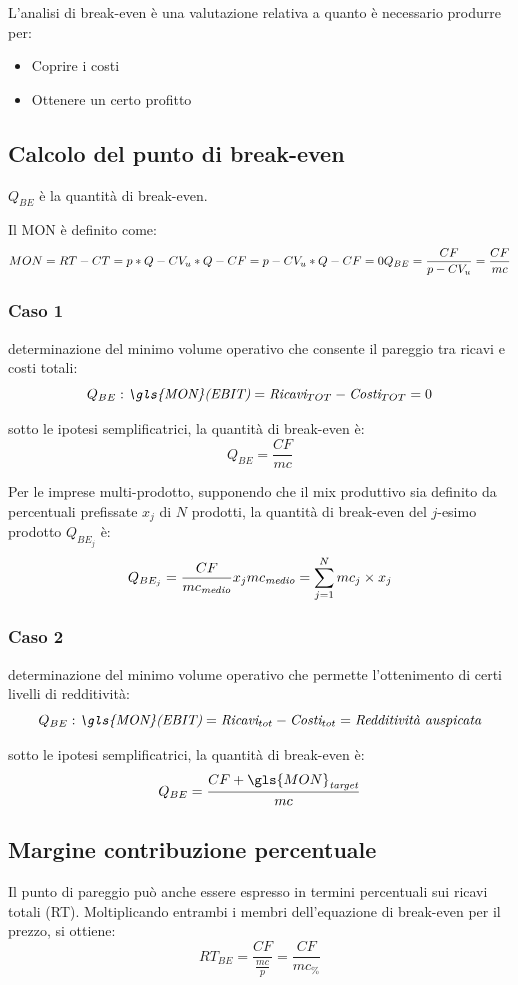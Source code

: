 L'analisi di break-even \`e una valutazione relativa a quanto è necessario produrre per:
\begin{itemize}
	\item Coprire i costi
	\item Ottenere un certo profitto
\end{itemize}

\subsection{Calcolo del punto di break-even}
$Q_{BE}$ \`e la quantit\`a di break-even.

Il MON \`e definito come:
\[
MON = RT - CT = p * Q - CV_u * Q - CF = p - CV_u * Q - CF = 0\\
Q_{BE} = \frac{CF}{p - CV_u} = \frac{CF}{mc}
\]

\subsubsection{Caso 1} determinazione del minimo volume operativo che consente il
pareggio tra ricavi e costi totali:
\[
Q_{BE} : \textit{\gls{MON}(EBIT)} = \textit{Ricavi}_{TOT} - \textit{Costi}_{TOT} = 0
\]

sotto le ipotesi semplificatrici, la quantità di break-even è:
\[
Q_{BE} = \frac{CF}{mc}
\]


Per le imprese multi-prodotto, supponendo che il mix produttivo sia definito da
percentuali prefissate $x_j$ di $N$ prodotti, la quantità di break-even del $j$-esimo
prodotto $Q_{BE_j}$ è:
\[
Q_{BE_j} = \frac{CF}{mc_\textit{medio}} x_j \\ mc_\textit{medio} = \sum^N_{j=1} mc_j \times x_j
\]

\subsubsection{Caso 2} determinazione del minimo volume operativo che permette
l'ottenimento di certi livelli di redditività:
\[
Q_{BE} : \textit{\gls{MON}(EBIT)} = \textit{Ricavi}_{tot} - \textit{Costi}_{tot} = \textit{Redditività auspicata}
\]

sotto le ipotesi semplificatrici, la quantità di break-even è:
\[
Q_{BE} = \frac{CF + \gls{MON}_\textit{target}}{mc}
\]

\subsection{Margine contribuzione percentuale}
Il punto di pareggio può anche essere espresso in termini percentuali sui ricavi
totali (RT). Moltiplicando entrambi i membri dell’equazione di break-even per il prezzo, si
ottiene:
\[
RT_{BE} = \frac{CF}{\frac{mc}{p}} = \frac{CF}{mc_\%}
\]

